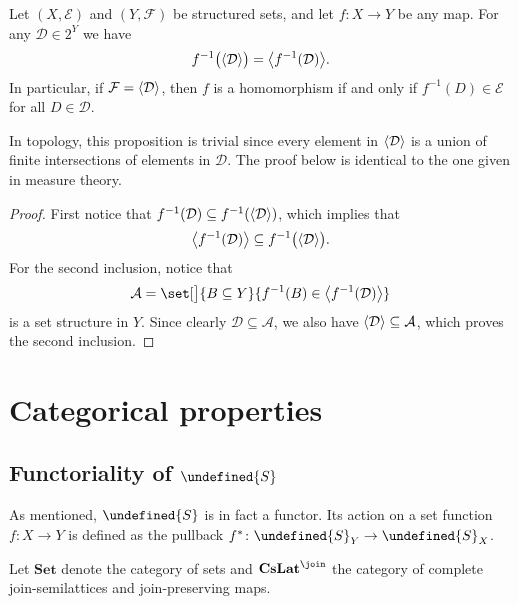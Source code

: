 \documentclass[article, a4paper, 11pt, oneside]{memoir}
\let\mathfrak\undefined
\numberwithin{equation}{chapter}
\newcommand{\calE}{\mathcal{E}}
\newcommand{\calD}{\mathcal{D}}
\newcommand{\calF}{\mathcal{F}}
\newcommand{\calA}{\mathcal{A}}
\newcommand{\strucS}{\mathfrak{S}}
\DeclarePairedDelimiter{\gen}{\langle}{\rangle} %
\newcommand{\ncat}[1]{\mathbf{#1}} %
\newcommand{\catSet}{\ncat{Set}} %
\newcommand{\catCJoinLat}{\ncat{CsLat}^{\join}} %
\begin{document}
\begin{proposition}
    \label{thm:preimage_and_generation_commute}
    Let $(X,\calE)$ and $(Y,\calF)$ be structured sets, and let $f \colon X \to Y$ be any map. For any $\calD \in 2^Y$ we have
    \begin{equation*}
        f^{-1}\bigl( \gen{\calD} \bigr) = \gen[\big]{f^{-1}(\calD)}.
    \end{equation*}
    In particular, if $\calF = \gen{\calD}$, then $f$ is a homomorphism if and only if $f^{-1}(D) \in \calE$ for all $D \in \calD$.
\end{proposition}
%
In topology, this proposition is trivial since every element in $\gen{\calD}$ is a union of finite intersections of elements in $\calD$. The proof below is identical to the one given in measure theory.

\begin{proof}
    First notice that $f^{-1}(\calD) \subseteq f^{-1}(\gen{\calD})$, which implies that
    \begin{equation*}
        \gen[\big]{f^{-1}(\calD)} \subseteq f^{-1}\bigl( \gen{\calD} \bigr).
    \end{equation*}
    For the second inclusion, notice that
    \begin{equation*}
        \calA = \set[\big]{B \subseteq Y}{f^{-1}(B) \in \gen[\big]{f^{-1}(\calD)}}
    \end{equation*}
    is a set structure in $Y$. Since clearly $\calD \subseteq \calA$, we also have $\gen{\calD} \subseteq \calA$, which proves the second inclusion.
\end{proof}


\section{Categorical properties} \label{sec:structure_categorical}

\subsection{Functoriality of $\strucS$}

As mentioned, $\strucS$ is in fact a functor. Its action on a set function $f \colon X \to Y$ is defined as the pullback $f^* \colon \strucS_Y \to \strucS_X$. 

Let $\catSet$ denote the category of sets and $\catCJoinLat$ the category of complete join-semilattices and join-preserving maps.
\end{document}
